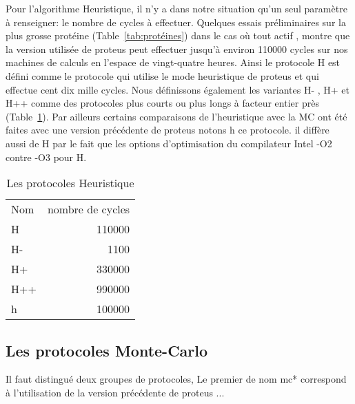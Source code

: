 Pour l'algorithme Heuristique, il n'y a dans notre situation qu'un seul paramètre à renseigner: le nombre de cycles à effectuer. Quelques essais préliminaires sur la plus grosse protéine (Table~\ref{tab:protéines}) dans le cas où tout actif , montre que la version utilisée de proteus peut effectuer jusqu'à environ 110000 cycles sur nos machines de calculs en l'espace de vingt-quatre heures. Ainsi le protocole H est défini comme le protocole qui utilise le mode heuristique de proteus et qui effectue cent dix mille cycles. Nous définissons également les variantes H- , H+ et H++ comme des protocoles plus courts ou plus longs à facteur entier près (Table~\ref{tab:protoH}). Par ailleurs certains comparaisons de l'heuristique avec la MC ont été faites avec une version précédente de proteus notons h ce protocole. il diffère  aussi de H par le fait que les options d'optimisation du compilateur Intel -O2 contre -O3 pour H.    


    \begin{table}[!htbp]
      \centering

      \begin{tabular}{lr}

        \toprule
        Nom & nombre de cycles \\
        \cmidrule{1-2}
        H   & 110000 \\  
        H-  & 1100   \\  
        H+  & 330000 \\  
        H++ & 990000 \\  
        h   & 100000 \\  
        \bottomrule

      \end{tabular}      
      \caption{Les protocoles Heuristique}
\label{tab:protoH}      
    \end{table}

   \subsection{Les protocoles Monte-Carlo}

Il faut distingué deux groupes de protocoles, Le premier de nom mc*  correspond à l'utilisation de la version précédente de proteus ...

